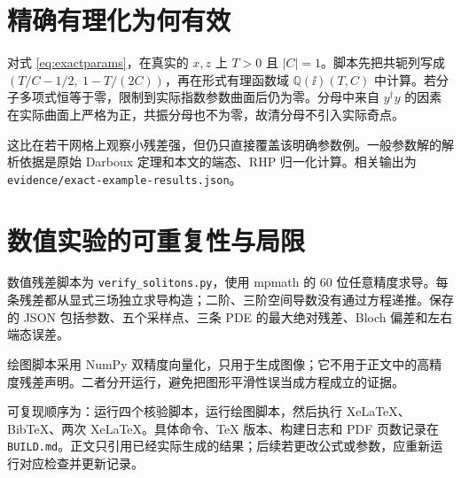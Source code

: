 \section{精确有理化为何有效}
对式 \eqref{eq:exactparams}，在真实的 $x,z$ 上 $T>0$ 且 $|C|=1$。脚本先把共轭列写成 $(T/C-1/2,\ 1-T/(2C))$，再在形式有理函数域 $\mathbb Q(\ii)(T,C)$ 中计算。若分子多项式恒等于零，限制到实际指数参数曲面后仍为零。分母中来自 $y^\dagger y$ 的因素在实际曲面上严格为正，共振分母也不为零，故清分母不引入实际奇点。

这比在若干网格上观察小残差强，但仍只直接覆盖该明确参数例。一般参数解的解析依据是原始 Darboux 定理和本文的端态、RHP 归一化计算。相关输出为
\texttt{evidence/exact-example-results.json}。

\section{数值实验的可重复性与局限}
数值残差脚本为 \texttt{verify\_solitons.py}，使用 mpmath 的 60 位任意精度求导。每条残差都从显式三场独立求导构造；二阶、三阶空间导数没有通过方程递推。保存的 JSON 包括参数、五个采样点、三条 PDE 的最大绝对残差、Bloch 偏差和左右端态误差。

绘图脚本采用 NumPy 双精度向量化，只用于生成图像；它不用于正文中的高精度残差声明。二者分开运行，避免把图形平滑性误当成方程成立的证据。

可复现顺序为：运行四个核验脚本，运行绘图脚本，然后执行 XeLaTeX、BibTeX、两次 XeLaTeX。具体命令、TeX 版本、构建日志和 PDF 页数记录在 \texttt{BUILD.md}。正文只引用已经实际生成的结果；后续若更改公式或参数，应重新运行对应检查并更新记录。
